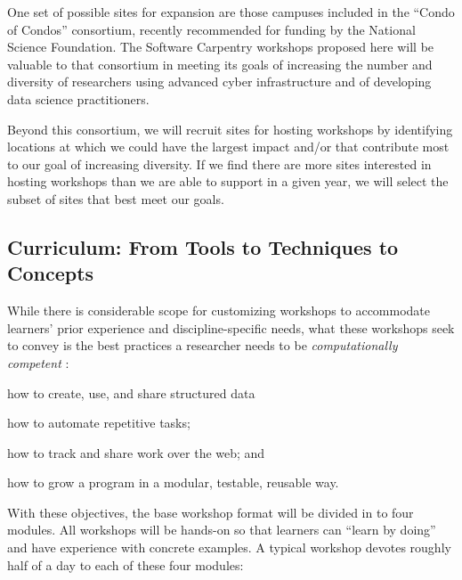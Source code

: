\documentclass{proposalnsf}
\newlength{\up}
\begin{document}
One set of possible sites for expansion are those campuses included in
the ``Condo of Condos'' consortium, recently recommended for funding
by the National Science Foundation.  The Software Carpentry workshops
proposed here will be valuable to that consortium in meeting its goals
of increasing the number and diversity of researchers using advanced
cyber infrastructure and of developing data science practitioners.

Beyond this consortium, we will recruit sites for hosting workshops by identifying locations at which we could have the largest impact and/or that contribute most to our goal of increasing diversity. If we find there are more sites interested in hosting workshops than we are able to support in a given year, we will select the subset of sites that best meet our goals.

\subsection{Curriculum: From Tools to Techniques to Concepts}
\label{sec:workshops}

While there is considerable scope for customizing workshops to
accommodate learners' prior experience and discipline-specific needs,
what these workshops seek to convey is the best
practices a researcher needs to be \emph{computationally competent}
\cite{wilson2013}:

\begin{compactitem}
\item
  how to create, use, and share structured data
\item
  how to automate repetitive tasks; 
\item
  how to track and share work over the web; and
\item
  how to grow a program in a modular, testable, reusable way.
\end{compactitem}

With these objectives, the base workshop format will be divided in to four 
modules.  All workshops will be hands-on so that learners can ``learn by doing'' 
and have experience with concrete examples. A typical workshop devotes roughly 
half of a day to each of these four modules:
\end{document}
